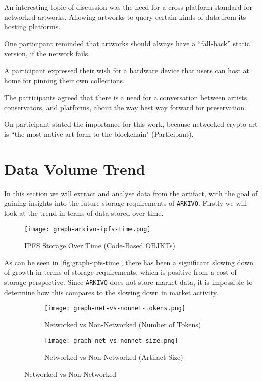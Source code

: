 An interesting topic of discussion was the need for a cross-platform standard for networked artworks. Allowing artworks to query certain kinds of data from its hosting platforms.

One participant reminded that artworks should always have a ``fall-back'' static version, if the network fails.

A participant expressed their wish for a hardware device that users can host at home for pinning their own collections.

The participants agreed that there is a need for a conversation between artists, conservators, and platforms, about the way best way forward for preservation.

On participant stated the importance for this work, because networked crypto art is ``the most native art form to the blockchain" (Participant).


\section{Data Volume Trend}

In this section we will extract and analyse data from the artifact, with the goal of gaining insights into the future storage requirements of \texttt{ARKIVO}.
Firstly we will look at the trend in terms of data stored over time.

\begin{figure}[h]
    \centering
    \texttt{[image: graph-arkivo-ipfs-time.png]}
    \caption[IPFS Storage Over Time (Code-Based OBJKTs)]{IPFS Storage Over Time (Code-Based OBJKTs)}
    \label{fig:graph-ipfs-time}
\end{figure}


As can be seen in \autoref{fig:graph-ipfs-time}, there has been a significant slowing down of growth in terms of storage requirements, which is positive from a cost of storage perspective. Since \texttt{ARKIVO} does not store market data, it is impossible to determine how this compares to the slowing down in market activity.

\begin{figure}[h]
  \centering
  \begin{subfigure}[b]{0.45\textwidth}
    \centering
    \texttt{[image: graph-net-vs-nonnet-tokens.png]}
    \caption{Networked vs Non-Networked (Number of Tokens)}
    \label{fig:graph-net-nonnet}
  \end{subfigure}
  \hfill
  \begin{subfigure}[b]{0.45\textwidth}
    \centering
    \texttt{[image: graph-net-vs-nonnet-size.png]}
    \caption{Networked vs Non-Networked (Artifact Size)}
    \label{fig:graph-net-vs-nonnet-size}
  \end{subfigure}
  \caption{Networked vs Non-Networked}
  \label{fig:net-vs-nonnet}
\end{figure}

